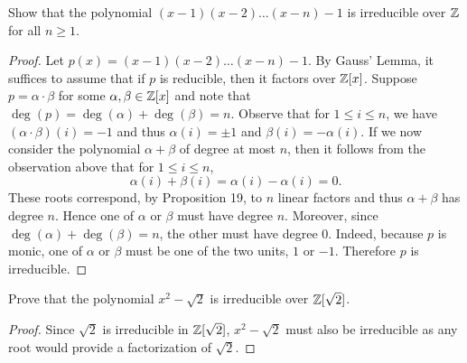 \documentclass[10pt]{amsart}
\begin{document}
\begin{thm}
  \label{Ex3}
  Show that the polynomial $(x-1)(x-2)\ldots(x-n)-1$ is irreducible over $\mathbb{Z}$ for all $n \geq 1$.
  \begin{proof}
    Let $p(x) = (x-1)(x-2)\ldots(x-n)-1$.
    By Gauss' Lemma, it suffices to assume that if $p$ is reducible, then it factors over $\mathbb{Z}[x]$.
    Suppose $p = \alpha\cdot\beta$ for some $\alpha, \beta \in \mathbb{Z}[x]$ and note that $\deg(p) = \deg(\alpha) + \deg(\beta) = n.$
    Observe that for $1 \leq i \leq n$, we have $(\alpha\cdot\beta)(i) = -1$ and thus $\alpha(i) = \pm 1$ and $\beta(i) = -\alpha(i)$.
    If we now consider the polynomial $\alpha + \beta$ of degree at most $n$, then it follows from the observation above that for $1 \leq i \leq n$, $$\alpha(i)+\beta(i) = \alpha(i) - \alpha(i) = 0.$$
    These roots correspond, by Proposition 19, to $n$ linear factors and thus $\alpha + \beta$ has degree $n$.  
    Hence one of $\alpha$ or $\beta$ must have degree $n$.
    Moreover, since $\deg(\alpha) + \deg(\beta) = n$, the other must have degree 0.
    Indeed, because $p$ is monic, one of $\alpha$ or $\beta$ must be one of the two units, $1$ or $-1$.
    Therefore $p$ is irreducible.
    
    
  \end{proof}
\end{thm}

\begin{thm}
  \label{Ex4}
  Prove that the polynomial $x^2 - \sqrt{2}$ is irreducible over $\mathbb{Z}[\sqrt{2}]$.
  \begin{proof}
    Since $\sqrt{2}$ is irreducible in $\mathbb{Z}[\sqrt{2}]$, $x^2 - \sqrt{2}$ must also be irreducible as any root would provide a factorization of $\sqrt{2}$.
  \end{proof}
\end{thm}
\end{document}
